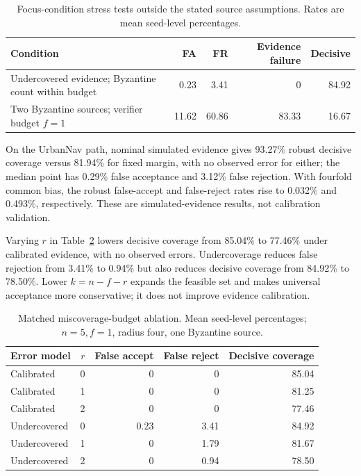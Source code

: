\documentclass[preprint,review,12pt]{elsarticle}
\begin{document}
\begin{table}[htbp]
\centering\small
\caption{Focus-condition stress tests outside the stated source assumptions. Rates are mean seed-level percentages.}
\label{tab:assumption-stress}
\begin{tabularx}{\linewidth}{@{}>{\raggedright\arraybackslash}Xrrrr@{}}
\toprule
Condition & FA & FR & Evidence failure & Decisive\\
\midrule
Undercovered evidence; Byzantine count within budget & 0.23 & 3.41 & 0 & 84.92\\
Two Byzantine sources; verifier budget $f=1$ & 11.62 & 60.86 & 83.33 & 16.67\\
\bottomrule
\end{tabularx}
\end{table}

On the UrbanNav path, nominal simulated evidence gives 93.27\% robust decisive coverage versus 81.94\% for fixed margin, with no observed error for either; the median point has 0.29\% false acceptance and 3.12\% false rejection. With fourfold common bias, the robust false-accept and false-reject rates rise to 0.032\% and 0.493\%, respectively. These are simulated-evidence results, not calibration validation.


Varying $r$ in Table~\ref{tab:miscoverage} lowers decisive coverage from 85.04\% to 77.46\% under calibrated evidence, with no observed errors. Undercoverage reduces false rejection from 3.41\% to 0.94\% but also reduces decisive coverage from 84.92\% to 78.50\%. Lower $k=n-f-r$ expands the feasible set and makes universal acceptance more conservative; it does not improve evidence calibration.
\begin{table}[htbp]
\centering\small
\caption{Matched miscoverage-budget ablation. Mean seed-level percentages; $n=5,f=1$, radius four, one Byzantine source.}\label{tab:miscoverage}
\begin{tabular}{lrrrr}
\toprule Error model&$r$&False accept&False reject&Decisive coverage\\\midrule
Calibrated&0&0&0&85.04\\
Calibrated&1&0&0&81.25\\
Calibrated&2&0&0&77.46\\
Undercovered&0&0.23&3.41&84.92\\
Undercovered&1&0&1.79&81.67\\
Undercovered&2&0&0.94&78.50\\\bottomrule
\end{tabular}
\end{table}
\end{document}
